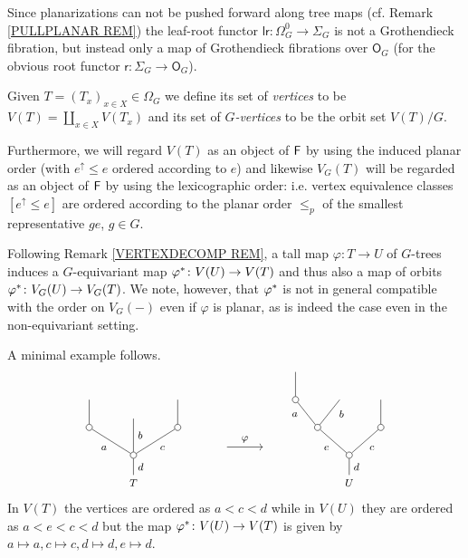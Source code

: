 \documentclass[a4paper,10pt]{article}%
\begin{document}
\begin{remark}\label{LRROOTMAP REM}
	Since planarizations can not be pushed forward along tree maps (cf. Remark \ref{PULLPLANAR REM})
the leaf-root functor $\mathsf{lr} \colon \Omega_{G}^0 \to \Sigma_G$ is not a Grothendieck fibration,
but instead only a map of Grothendieck fibrations over $\mathsf{O}_G$ 
(for the obvious root functor $\mathsf{r} \colon \Sigma_G \to \mathsf{O}_G$).
\end{remark}


\begin{definition}\label{VG DEF}
Given $T = (T_x)_{x \in X} \in \Omega_G$ we define its set of \textit{vertices} to be $V(T) = \coprod_{x \in X} V(T_x)$
and its set of
	\textit{$G$-vertices} to be the orbit set $V(T)/G$.
	
Furthermore, we will regard 
$V(T)$ as an object of $\mathsf{F}$ by using the induced planar order
(with $e^{\uparrow}\leq e$ ordered according to $e$)
and likewise $V_G(T)$ will be regarded as an object of $\mathsf{F}$ by using the lexicographic order: i.e. vertex equivalence classes 
$[e^{\uparrow} \leq e]$ are ordered according to the planar order $\leq_p$ of the smallest representative $ge$, $g \in G$.
\end{definition}


\begin{remark}\label{VERTEXDECOMPG REM}
	Following Remark \ref{VERTEXDECOMP REM},
	a tall map $\varphi \colon T \to U$ of $G$-trees
	induces a $G$-equivariant map
	$\varphi^{\**} \colon V(U) \to V(T)$
	and thus also a map of orbits
	$\varphi^{\**} \colon V_G(U) \to V_G(T)$.
	We note, however, that $\varphi^{\**}$ is not in general compatible with the order on $V_G(\minus)$ even if $\varphi$ is planar, as is indeed the case even in the non-equivariant setting.

A minimal example follows.
		\[
		\begin{tikzpicture}[grow=up,auto,level distance=2.2em,
		every node/.style = {font=\footnotesize},
		dummy/.style={circle,draw,inner sep=0pt,minimum size=1.75mm}]
		\node at (0,0) {$T$}
			child{node [dummy] {}
				child[sibling distance = 3.5em]{node [dummy] {}
					child
				edge from parent node[swap] {$c$}}
				child[level distance=2.9em]{
				edge from parent node [swap] {$b$}}
				child[sibling distance = 3.5em]{node [dummy] {}
					child
				edge from parent node {$a$}}		
			edge from parent node [swap] {$d$}};
		\node at (6,0) {$U$}
			child{node [dummy] {}
				child[sibling distance = 5em]{node [dummy] {}
					child
				edge from parent node [swap] {$c$}}
				child[sibling distance = 5em]{node [dummy] {}
					child[sibling distance = 3.5em]{
					edge from parent node [swap,near end] {$b$}}
					child[sibling distance = 3.5em]{node [dummy] {}
						child
					edge from parent node [near end]{$a$}}
				edge from parent node {$e$}}
			edge from parent node [swap] {$d$}};
		\draw[->] (2.6,1) -- node [above] {$\varphi$} (3.6,1) ;
		\end{tikzpicture}
		\]
In $V(T)$ the vertices are ordered as $a<c<d$ while in $V(U)$ they are ordered as $a<e<c<d$ but the map 
$\varphi^{\**} \colon V(U) \to V(T)$ is given by 
$a \mapsto a, c \mapsto c, d \mapsto d, e \mapsto d$.
\end{remark}
\end{document}

